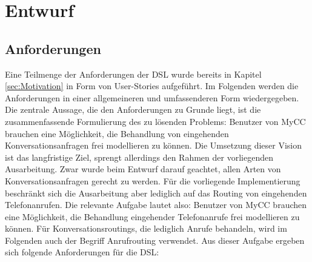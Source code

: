 \chapter{Entwurf}
\label{chap:Entwurf}

\section{Anforderungen}
Eine Teilmenge der Anforderungen der DSL wurde bereits in Kapitel \ref{sec:Motivation} in Form von User-Stories aufgeführt. Im Folgenden werden die Anforderungen in einer allgemeineren und umfassenderen Form wiedergegeben. Die zentrale Aussage, die den Anforderungen zu Grunde liegt, ist die zusammenfassende Formulierung des zu lösenden Problems: Benutzer von MyCC brauchen eine Möglichkeit, die Behandlung von eingehenden Konversationsanfragen frei modellieren zu können. Die Umsetzung dieser Vision ist das langfristige Ziel, sprengt allerdings den Rahmen der vorliegenden Ausarbeitung. Zwar wurde beim Entwurf darauf geachtet, allen Arten von Konversationsanfragen gerecht zu werden. Für die vorliegende Implementierung beschränkt sich die Ausarbeitung aber lediglich auf das Routing von eingehenden Telefonanrufen. Die relevante Aufgabe lautet also: Benutzer von MyCC brauchen eine Möglichkeit, die Behandlung eingehender Telefonanrufe frei modellieren zu können. Für Konversationsroutings, die lediglich Anrufe behandeln, wird im Folgenden auch der Begriff Anrufrouting verwendet.
\newline
Aus dieser Aufgabe ergeben sich folgende Anforderungen für die DSL:
